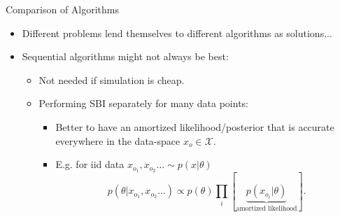 \documentclass[12pt, aspectratio=169]{beamer}
\let\olditem\item
\renewcommand\item{\olditem\justifying}
\begin{document}
\begin{frame}{Comparison of Algorithms}
\begin{itemize}[<+->]
    \item Different problems lend themselves to different algorithms as solutions...

    \item Sequential algorithms might not always be best:
    \begin{itemize}
        \item Not needed if simulation is cheap.

        \item Performing SBI separately for many data points:
        \begin{itemize}
            \item Better to have an amortized likelihood/posterior that is accurate everywhere in the data-space $x_o \in \mathcal{X}$.
            \item E.g. for iid data $x_{o_1}, x_{o_2} \ldots \sim p(x | \theta)$
            $$p(\theta | x_{o_1}, x_{o_2} \ldots) \propto p(\theta) \prod_i \left[\underbrace{p(x_{o_i} | \theta)}_{\text{amortized likelihood}}\right].$$
        \end{itemize}
        
    \end{itemize}
\end{itemize}
\end{frame}


\end{document}
